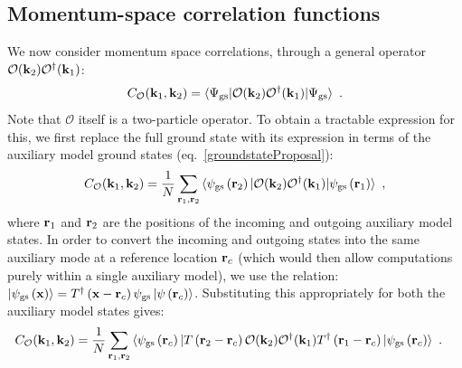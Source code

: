 \documentclass[reprint,hidelinks,onecolumn]{revtex4-2}
\begin{document}
\subsection{Momentum-space correlation functions}
We now consider momentum space correlations, through a general operator \(\mathcal{O}({\bf k}_2)\mathcal{O}^\dagger({\bf k}_1)\):
\begin{equation}\begin{aligned}
	C_{\mathcal{O}}({\bf k}_1,{\bf k}_2) = \braket{\Psi_\text{gs} | \mathcal{O}({\bf k}_2)\mathcal{O}^\dagger({\bf k}_1) | \Psi_\text{gs}}~.
\end{aligned}\end{equation}
Note that \(\mathcal{O}\) itself is a two-particle operator. To obtain a tractable expression for this, we first replace the full ground state with its expression in terms of the auxiliary model ground states (eq.~\ref{groundstateProposal}):
\begin{equation}\begin{aligned}
	C_{\mathcal{O}}({\bf k}_1,{\bf k}_2) = \frac{1}{N}\sum_{{\bf r}_1,{\bf r}_2}\braket{\psi_\text{gs}\left({\bf r}_2\right)  | \mathcal{O}({\bf k}_2)\mathcal{O}^\dagger({\bf k}_1) | \psi_\text{gs}\left({\bf r}_1\right)}~,
\end{aligned}\end{equation}
where \({\bf r}_1\) and \({\bf r}_2 \) are the positions of the incoming and outgoing auxiliary model states. In order to convert the incoming and outgoing states into the same auxiliary mode at a reference location \({\bf r}_c\) (which would then allow computations purely within a single auxiliary model), we use the relation: \(\ket{\psi_\text{gs}\left({\bf x}\right)} = T^\dagger\left({\bf x} - {\bf r}_c\right)\psi_\text{gs}\ket{\psi\left({\bf r}_c \right)}\). Substituting this appropriately for both the auxiliary model states gives:
\begin{equation}\begin{aligned}
	C_{\mathcal{O}}({\bf k}_1,{\bf k}_2) &= \frac{1}{N}\sum_{{\bf r}_1,{\bf r}_2}\braket{\psi_\text{gs}\left({\bf r}_c\right) | T\left({\bf r}_2 - {\bf r}_c\right) \mathcal{O}({\bf k}_2)\mathcal{O}^\dagger({\bf k}_1) T^\dagger\left({\bf r}_1 - {\bf r}_c\right) | \psi_\text{gs}\left({\bf r}_c\right)}~.
\end{aligned}\end{equation}
\end{document}

